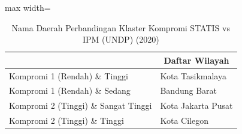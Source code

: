 \begin{table}[H]
\centering
\caption{Nama Daerah Perbandingan Klaster Kompromi STATIS vs IPM (UNDP) (2020)} \label{tab:sample2comp_ipm_name_2020}
\begin{adjustbox}{max width=\textwidth}
\begin{tabular}{|>{\centering\arraybackslash}p{4cm}|p{10cm}|}
\hline
\multicolumn{1}{|c|}{\textbf{Kategori}} & \multicolumn{1}{c|}{\textbf{Daftar Wilayah}} \\
\hline
Kompromi 1 (Rendah) \& Tinggi & Kota Tasikmalaya \\
\hline
Kompromi 1 (Rendah) \& Sedang & Bandung Barat \\
\hline
Kompromi 2 (Tinggi) \& Sangat Tinggi & Kota Jakarta Pusat \\
\hline
Kompromi 2 (Tinggi) \& Tinggi & Kota Cilegon \\
\hline
\end{tabular}
\end{adjustbox}
\end{table}